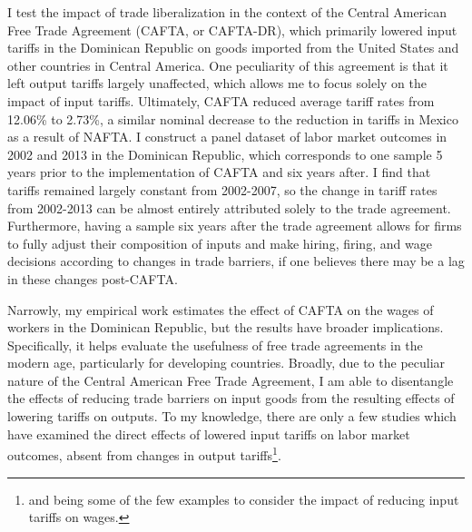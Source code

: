 \documentclass[12pt]{article}
\begin{document}
I test the impact of trade liberalization in the context of the Central American Free Trade Agreement
(CAFTA, or CAFTA-DR), which primarily lowered input tariffs in the Dominican Republic on goods imported from
the United States and other countries in Central America. One peculiarity of this agreement is
that it left output tariffs largely unaffected, which allows me to focus solely on the impact 
of input tariffs. Ultimately, CAFTA reduced average tariff rates from 12.06\% to 2.73\%, a similar 
nominal decrease to the reduction in tariffs in Mexico as a result of NAFTA. I construct a panel
dataset of labor market outcomes in 2002 and 2013 in the Dominican Republic, which corresponds to
one sample 5 years prior to the implementation of CAFTA and six years after. I find that tariffs
remained largely constant from 2002-2007, so the change in tariff rates from 2002-2013 can be
almost entirely attributed solely to the trade agreement. Furthermore, having a sample six years
after the trade agreement allows for firms to fully adjust their composition of inputs and make hiring, firing,
and wage decisions according to changes in trade barriers, if one believes there may be a lag 
in these changes post-CAFTA.


Narrowly, my empirical work estimates the effect of CAFTA on the wages of workers in the 
Dominican Republic, but the results have broader implications. Specifically, it helps
evaluate the usefulness of free trade agreements in the modern age, particularly for developing
countries. Broadly, due to the peculiar nature
of the Central American Free Trade Agreement, I am able to disentangle the effects
of reducing trade barriers on input goods from the resulting effects of lowering tariffs on outputs.
To my knowledge, there are only a few studies which have examined the direct effects of lowered input 
tariffs on labor market outcomes, absent from changes in output tariffs\footnote{\citet{amiti2012trade}
and \citet{amiti} being some of the few examples to consider the impact of reducing input 
tariffs on wages.}.

\end{document}
